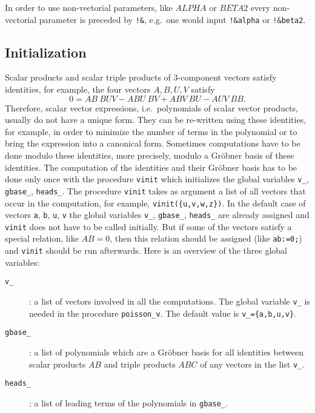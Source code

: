 In order to use non-vectorial parameters, like $\mathit{ALPHA}$ or
$\mathit{BETA2}$ every non-vectorial parameter is preceded by
\texttt{!\&}, e.g.\ one would input \texttt{!\&alpha} or
\texttt{!\&beta2}.

\subsection{Initialization}
Scalar products and scalar triple products of 3-component vectors
satisfy identities, for example, the four vectors $A,B,U,V$ satisfy
\[ 0 = AB\ BUV - ABU\ BV + ABV\ BU - AUV\ BB. \]
Therefore, scalar vector expressions, i.e.\ polynomials of scalar
vector products, usually do not have a unique form.  They can be
re-written using these identities, for example, in order to minimize
the number of terms in the polynomial or to bring the expression into
a canonical form.  Sometimes computations have to be done modulo these
identities, more precisely, modulo a Gr\"{o}bner basis of these
identities.  The computation of the identities and their Gr\"{o}bner
basis has to be done only once with the procedure \texttt{vinit} which
initializes the global variables \texttt{v\_}, \texttt{gbase\_},
\texttt{heads\_}.  The procedure \texttt{vinit} takes as argument a
list of all vectors that occur in the computation, for example,
\texttt{vinit(\{u,v,w,z\})}.  In the default case of vectors
\texttt{a}, \texttt{b}, \texttt{u}, \texttt{v} the global variables
\texttt{v\_}, \texttt{gbase\_}, \texttt{heads\_} are already assigned
and \texttt{vinit} does not have to be called initially.  But if some
of the vectors satisfy a special relation, like $\mathit{AB}=0$, then
this relation should be assigned (like \texttt{ab:=0;}) and
\texttt{vinit} should be run afterwards.  Here is an overview of the
three global variables:
\begin{description}
\item[\texttt{v\_}] : a list of vectors involved in all the
  computations.  The global variable \texttt{v\_} is needed in the
  procedure \texttt{poisson\_v}.  The default value is
  \texttt{v\_=\{a,b,u,v\}}.
\item[\texttt{gbase\_}] : a list of polynomials which are a
  Gr\"{o}bner basis for all identities between scalar products
  $\mathit{AB}$ and triple products $\mathit{ABC}$ of any vectors in
  the list \texttt{v\_}.
\item[\texttt{heads\_}] : a list of leading terms of the polynomials
  in \texttt{gbase\_}.
\end{description}

